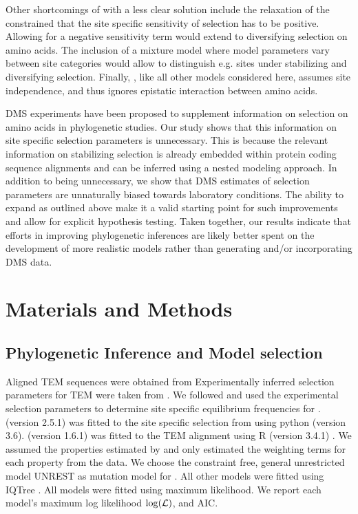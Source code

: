 Other shortcomings of \selac with a less clear solution include the relaxation of the constrained that the site specific sensitivity of selection has to be positive.
Allowing for a negative sensitivity term would extend \selac to diversifying selection on amino acids.
The inclusion of a mixture model where model parameters vary between site categories would allow to distinguish e.g. sites under stabilizing and diversifying selection.
Finally, \selac, like all other models considered here, assumes site independence, and thus ignores epistatic interaction between amino acids.

DMS experiments have been proposed to supplement information on selection on amino acids in phylogenetic studies.
Our study shows that this information on site specific selection parameters is unnecessary.
This is because the relevant information on stabilizing selection is already embedded within protein coding sequence alignments and can be inferred using a nested modeling approach.
In addition to being unnecessary, we show that DMS estimates of selection parameters are unnaturally biased towards laboratory conditions.
The ability to expand \selac as outlined above make it a valid starting point for such improvements and allow for explicit hypothesis testing.
Taken together, our results indicate that efforts in improving phylogenetic inferences are likely better spent on the development of more realistic models rather than generating and/or incorporating DMS data.


\section{Materials and Methods}

\subsection{Phylogenetic Inference and Model selection}

Aligned TEM sequences were obtained from \citet{bloom2017}
Experimentally inferred selection parameters for TEM were taken from \citet{stiffler2016}.
We followed \citep{bloom2017} and used the experimental selection parameters to determine site specific equilibrium frequencies for \phydms. 
\phydms (version 2.5.1) was fitted to the site specific selection from \citet{stiffler2016} using python (version 3.6).
\selac (version 1.6.1) was fitted to the TEM alignment using R (version 3.4.1) \citep{rcore}.
We assumed the \PC properties estimated by \citet{grantham1974} and only estimated the weighting terms for each property from the data.
We choose the constraint free, general unrestricted model UNREST \citep{Yang1994} as mutation model for \selac.
All other models were fitted using IQTree \citep{nguyen2015}.
All models were fitted using maximum likelihood.
We report each model's maximum log likelihood $\log(\mathcal{L})$, and AIC.


